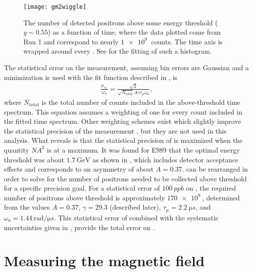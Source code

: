 \begin{figure}
    \centering
    \texttt{[image: gm2wiggle]}
    \caption[\gmtwo time spectrum example]{The number of detected positrons above some energy threshold ($y \sim 0.55$) as a function of time, where the data plotted come from Run 1 and correspond to nearly $\SI{1e9}{}$ counts. The time axis is wrapped around every . See  for the fitting of such a histogram.}
    \label{fig:gm2wiggle}
\end{figure}


The statistical error on the \wa measurement, assuming bin errors are Gaussian and a \chisq minimization is used with the fit function described in , is \cite{statisticspaper}
        \begin{align} \label{eq:waprecision}
            \frac{\sigma_{\omega_{a}}}{\omega_{a}} = \frac{\sqrt{2}}{\sqrt{N_{\text{total}}}A\gamma\tau_{\mu}\omega_{a}},
        \end{align}
where $N_{\text{total}}$ is the total number of counts included in the above-threshold time spectrum. This equation assumes a weighting of one for every count included in the fitted time spectrum. Other weighting schemes exist which slightly improve the statistical precision of the \wa measurement \cite{statisticspaper}, but they are not used in this analysis. What  reveals is that the statistical precision of \wa is maximized when the quantity $NA^{2}$ is at a maximum. It was found for E989 that the optimal energy threshold was about $\SI{1.7}{\GeV}$ as shown in , which includes detector acceptance effects and corresponds to an asymmetry of about $A = 0.37$.  can be rearranged in order to solve for the number of positrons needed to be collected above threshold for a specific precision goal. For a statistical error of $\SI{100}{ppb}$ on \wa, the required number of positrons above threshold is approximately $\SI{170e9}{}$, determined from the values $A = 0.37$, $\gamma = 29.3$ (described later), $\tau_{\mu} = \SI{2.2}{\micro s}$, and $\omega_{a} = \SI{1.44}{\text{rad}/\micro s}$. This statistical error of \wa combined with the systematic uncertainties given in , provide the total error on \wa.



\section{Measuring the magnetic field}
\label{sec:MagneticField}


